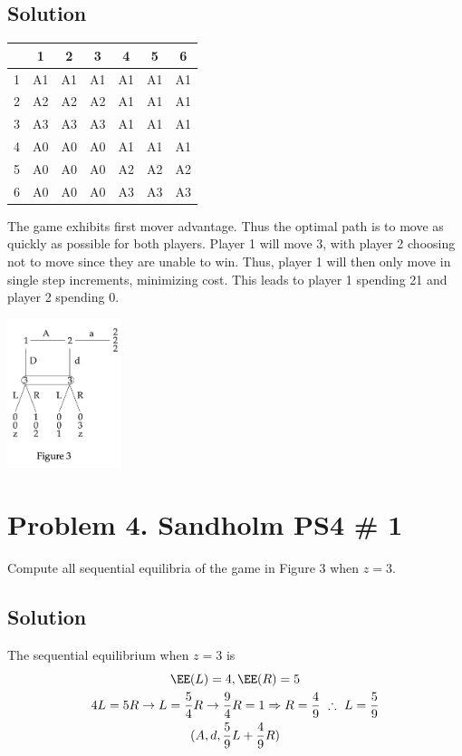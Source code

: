 \documentclass[10pt, a4paper]{article}
\begin{document}
  \subsection*{Solution}
    \begin{center}
      \begin{tabular}{|c|c|c|c|c|c|c|}
        \hline
        & 1 & 2 & 3 & 4 & 5 & 6 \\
        \hline
        1 & A1 & A1 & A1 & A1 & A1 & A1 \\
        2 & A2 & A2 & A2 & A1 & A1 & A1 \\
        3 & A3 & A3 & A3 & A1 & A1 & A1 \\
        4 & A0 & A0 & A0 & A1 & A1 & A1 \\
        5 & A0 & A0 & A0 & A2 & A2 & A2 \\
        6 & A0 & A0 & A0 & A3 & A3 & A3 \\
        \hline
      \end{tabular}
    \end{center}
  The game exhibits first mover advantage. Thus the optimal path is to move as quickly as possible for both players. Player 1 will move 3, with player 2 choosing not to move since they are unable to win. Thus, player 1 will then only move in single step increments, minimizing cost. This leads to player 1 spending 21 and player 2 spending 0. 
  \begin{center}
    \includegraphics[width=0.25\textwidth]{fig3.png}
  \end{center}
\section*{Problem 4. Sandholm PS4 \# 1}
  Compute all sequential equilibria of the game in Figure 3 when $z=3$.
  \subsection*{Solution}
    The sequential equilibrium when $z=3$ is 
    \begin{gather*}
      \EE(L) = 4, \EE(R) = 5\\
      4L = 5R \rightarrow L = \frac{5}{4}R \rightarrow \frac{9}{4}R = 1 \Rightarrow R = \frac{4}{9} \ \therefore \ L = \frac{5}{9} \\
      (A, d, \frac{5}{9}L + \frac{4}{9}R)
    \end{gather*}
\end{document}
